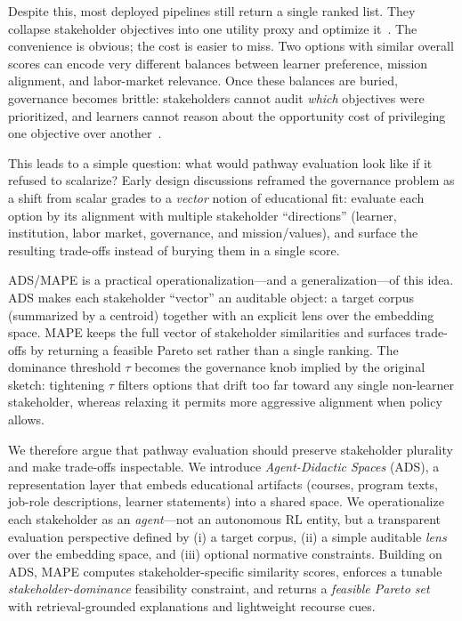 \documentclass[sigconf,review]{acmart}
\newcommand{\ADS}{\textsc{ADS}\xspace}
\newcommand{\MAPE}{\textsc{MAPE}\xspace}
\begin{document}
Despite this, most deployed pipelines still return a single ranked list. They collapse stakeholder objectives into one utility proxy and optimize it~\cite{roijers2013survey_mosdm}. The convenience is obvious; the cost is easier to miss. Two options with similar overall scores can encode very different balances between learner preference, mission alignment, and labor-market relevance. Once these balances are buried, governance becomes brittle: stakeholders cannot audit \emph{which} objectives were prioritized, and learners cannot reason about the opportunity cost of privileging one objective over another~\cite{zhang2020explainableRS}.

This leads to a simple question: what would pathway evaluation look like if it refused to scalarize? Early design discussions reframed the governance problem as a shift from scalar grades to a \emph{vector} notion of educational fit: evaluate each option by its alignment with multiple stakeholder ``directions'' (learner, institution, labor market, governance, and mission/values), and surface the resulting trade-offs instead of burying them in a single score.

\ADS/\MAPE is a practical operationalization---and a generalization---of this idea. \ADS makes each stakeholder ``vector'' an auditable object: a target corpus (summarized by a centroid) together with an explicit lens over the embedding space. \MAPE keeps the full vector of stakeholder similarities and surfaces trade-offs by returning a feasible Pareto set rather than a single ranking. The dominance threshold $\tau$ becomes the governance knob implied by the original sketch: tightening $\tau$ filters options that drift too far toward any single non-learner stakeholder, whereas relaxing it permits more aggressive alignment when policy allows.

We therefore argue that pathway evaluation should preserve stakeholder plurality and make trade-offs inspectable. We introduce \emph{Agent-Didactic Spaces} (\ADS), a representation layer that embeds educational artifacts (courses, program texts, job-role descriptions, learner statements) into a shared space. We operationalize each stakeholder as an \emph{agent}---not an autonomous RL entity, but a transparent evaluation perspective defined by (i) a target corpus, (ii) a simple auditable \emph{lens} over the embedding space, and (iii) optional normative constraints. Building on \ADS, \MAPE computes stakeholder-specific similarity scores, enforces a tunable \emph{stakeholder-dominance} feasibility constraint, and returns a \emph{feasible Pareto set} with retrieval-grounded explanations and lightweight recourse cues.
\end{document}
